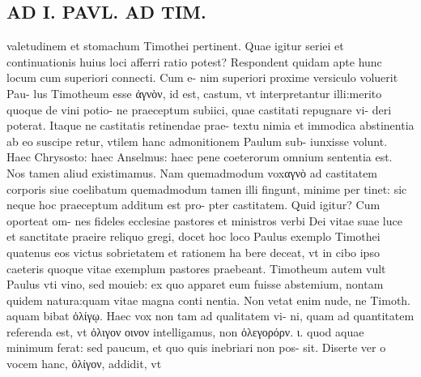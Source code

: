 \documentclass{article}
\begin{document}
\begin{pages}
\section*{AD I. PAVL. AD TIM. }
\marginpar{[ p.368 ]}\pstart valetudinem et stomachum Timothei pertinent. Quae igitur seriei et continuationis huius loci afferri ratio potest? Respondent quidam apte hunc locum cum superiori connecti. Cum e- nim superiori proxime versiculo voluerit Pau- lus Timotheum esse ἀγνὸν, id est, castum, vt interpretantur illi:merito quoque de vini potio- ne praeceptum subiici, quae castitati repugnare vi- deri poterat. Itaque ne castitatis retinendae prae- textu nimia et immodica abstinentia ab eo suscipe retur, vtilem hanc admonitionem Paulum sub- iunxisse volunt. Haec Chrysosto: haec Anselmus: haec pene coeterorum omnium sententia est. Nos tamen aliud existimamus. Nam quemadmodum voxαγνὸ ad castitatem corporis siue coelibatum quemadmodum tamen illi fingunt, minime per tinet: sic neque hoc praeceptum additum est pro- pter castitatem. Quid igitur? Cum oporteat om- nes fideles ecclesiae pastores et ministros verbi Dei vitae suae luce et sanctitate praeire reliquo gregi, docet hoc loco Paulus exemplo Timothei quatenus eos victus sobrietatem et rationem ha bere deceat, vt in cibo ipso caeteris quoque vitae exemplum pastores praebeant. Timotheum autem vult Paulus vti vino, sed mouieb: ex quo apparet eum fuisse abstemium, nontam quidem natura:quam vitae magna conti nentia. Non vetat enim nude, ne Timoth. aquam bibat ὀλίγῳ. Haec vox non tam ad qualitatem vi- ni, quam ad quantitatem referenda est, vt ὀλιγον οινον intelligamus, non ὀλεγορόρν. ι. quod aquae minimum ferat: sed paucum, et quo quis inebriari non pos- sit. Diserte ver o vocem hanc, ὀλίγον, addidit, vt  \pend

\end{pages}
\end{document}
